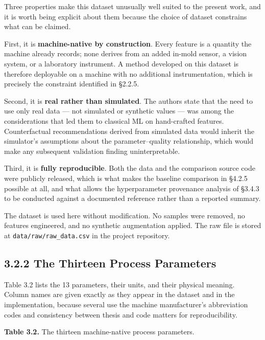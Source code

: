 Three properties make this dataset unusually well suited to the present work, and it is worth being explicit about them because the choice of dataset constrains what can be claimed.

First, it is \textbf{machine-native by construction}. Every feature is a quantity the machine already records; none derives from an added in-mold sensor, a vision system, or a laboratory instrument. A method developed on this dataset is therefore deployable on a machine with no additional instrumentation, which is precisely the constraint identified in §2.2.5.

Second, it is \textbf{real rather than simulated}. The authors state that the need to use only real data --- not simulated or synthetic values --- was among the considerations that led them to classical ML on hand-crafted features. Counterfactual recommendations derived from simulated data would inherit the simulator's assumptions about the parameter--quality relationship, which would make any subsequent validation finding uninterpretable.

Third, it is \textbf{fully reproducible}. Both the data and the comparison source code were publicly released, which is what makes the baseline comparison in §4.2.5 possible at all, and what allows the hyperparameter provenance analysis of §3.4.3 to be conducted against a documented reference rather than a reported summary.

The dataset is used here without modification. No samples were removed, no features engineered, and no synthetic augmentation applied. The raw file is stored at \texttt{data/raw/raw\_data.csv} in the project repository.

\hypertarget{the-thirteen-process-parameters}{%
\subsection{3.2.2 The Thirteen Process Parameters}\label{the-thirteen-process-parameters}}

Table 3.2 lists the 13 parameters, their units, and their physical meaning. Column names are given exactly as they appear in the dataset and in the implementation, because several use the machine manufacturer's abbreviation codes and consistency between thesis and code matters for reproducibility.

\textbf{Table 3.2.} The thirteen machine-native process parameters.

